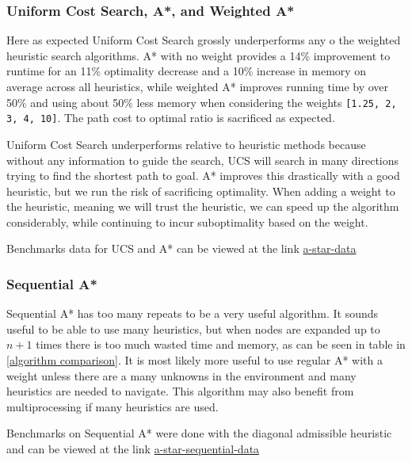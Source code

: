 \documentclass[11pt,letter]{article}
\begin{document}
\subsubsection{Uniform Cost Search, A*, and Weighted A*}
\par Here as expected Uniform Cost Search grossly underperforms any o the weighted heuristic search algorithms. A* with no weight provides a 14\% improvement to runtime for an 11\% optimality decrease and a 10\% increase in memory on average across all heuristics, while weighted A* improves running time by over 50\% and using about 50\% less memory when considering the weights \verb_[1.25, 2, 3, 4, 10]_. The path cost to optimal ratio is sacrificed as expected.\\
\par Uniform Cost Search  underperforms relative to heuristic methods because without any information to guide the search, UCS will search in many directions trying to find the shortest path to goal. A* improves this drastically with a good heuristic, but we run the risk of sacrificing optimality. When adding a weight to the heuristic, meaning we will trust the heuristic, we can speed up the algorithm considerably, while continuing to incur suboptimality based on the weight.
\\
\par Benchmarks data for UCS and A* can be viewed at the link \href{https://docs.google.com/spreadsheets/d/1ZdutLyAf5Jvw3L9p1cG2fGdi5LS3Mg2Jx-hI8yP902E/edit#gid=1408696378}{a-star-data}

\subsubsection{Sequential A*}
Sequential A* has too many repeats to be a very useful algorithm. It sounds useful to be able to use many heuristics, but when nodes are expanded up to $n+1$ times there is too much wasted time and memory, as can be seen in table in \ref{algorithm comparison}. It is most likely more useful to use regular A* with a weight unless there are a many unknowns in the environment and many heuristics are needed to navigate. This algorithm may also benefit from multiprocessing if many heuristics are used.\\
\par
Benchmarks on Sequential A* were done with the diagonal admissible heuristic and can be viewed at the link \href{https://docs.google.com/spreadsheets/d/1ZdutLyAf5Jvw3L9p1cG2fGdi5LS3Mg2Jx-hI8yP902E/edit#gid=971154194}{a-star-sequential-data}
\end{document}

